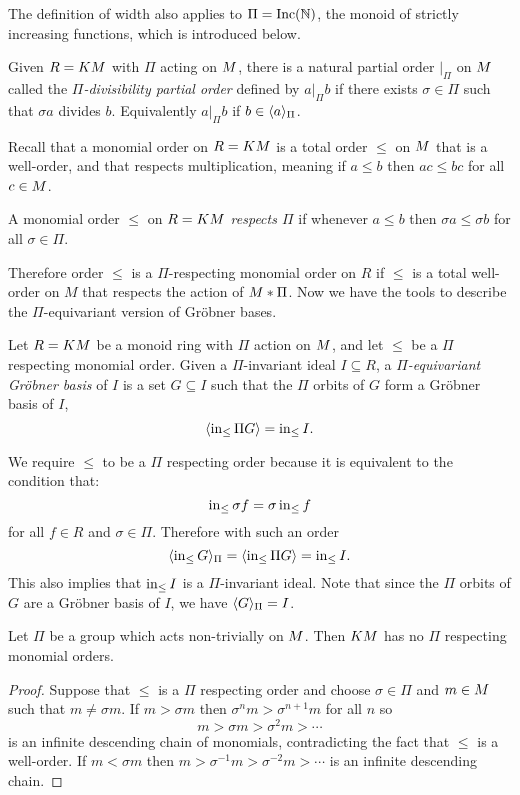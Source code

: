 The definition of width also applies to $\Pi = \operatorname{Inc}(\mathbb N)$, the monoid of strictly increasing functions, which is introduced below.
 
\begin{definition}
 Given $R = KM$ with $\Pi$ acting on $M$, there is a natural partial order $|_\Pi$ on $M$ called the {\em $\Pi$-divisibility partial order} defined by $a |_\Pi b$ if there exists $\sigma \in \Pi$ such that $\sigma a$ divides $b$.  Equivalently $a |_\Pi b$ if $b \in \langle a \rangle_\Pi$.
\end{definition}

Recall that a monomial order on $R = KM$ is a total order $\leq$ on $M$ that is a well-order, and that respects multiplication, meaning if $a \leq b$ then $ac \leq bc$ for all $c \in M$.

\begin{definition}
 A monomial order $\leq$ on $R = KM$ {\em respects $\Pi$} if whenever $a \leq b$ then $\sigma a \leq \sigma b$ for all $\sigma \in \Pi$.
\end{definition}

Therefore order $\leq$ is a $\Pi$-respecting monomial order on $R$ if $\leq$ is a total well-order on $M$ that respects the action of $M*\Pi$.
Now we have the tools to describe the $\Pi$-equivariant version of Gr\"obner bases.
\begin{definition}
 Let $R = KM$ be a monoid ring with $\Pi$ action on $M$, and let $\leq$ be a $\Pi$ respecting monomial order.  Given a $\Pi$-invariant ideal $I \subseteq R$, a {\em $\Pi$-equivariant Gr\"obner basis} of $I$ is a set $G \subseteq I$ such that the $\Pi$ orbits of $G$ form a Gr\"obner basis of $I$,
 \[ \langle \operatorname{in}_{\leq} \Pi G \rangle = \operatorname{in}_{\leq} I. \]
\end{definition}
We require $\leq$ to be a $\Pi$ respecting order because it is equivalent to the condition that:
\[ \operatorname{in}_{\leq} \sigma f = \sigma \operatorname{in}_{\leq} f \]
for all $f \in R$ and $\sigma \in \Pi$.  Therefore with such an order
 \[ \langle \operatorname{in}_{\leq} G \rangle_{\Pi} = \langle \operatorname{in}_{\leq} \Pi G \rangle = \operatorname{in}_{\leq} I. \]
This also implies that $\operatorname{in}_{\leq} I$ is a $\Pi$-invariant ideal.  Note that since the $\Pi$ orbits of $G$ are a Gr\"obner basis of $I$, we have $\langle G \rangle_\Pi = I$.


\begin{proposition}\label{prop:nogroup}
 Let $\Pi$ be a group which acts non-trivially on $M$.  Then $KM$ has no $\Pi$ respecting monomial orders.
\end{proposition}
\begin{proof}
 Suppose that $\leq$ is a $\Pi$ respecting order and choose $\sigma \in \Pi$ and $m \in M$ such that $m \neq \sigma m$.  If $m > \sigma m$ then $\sigma^n m > \sigma^{n+1} m$ for all $n$ so
  \[ m > \sigma m > \sigma^2 m > \cdots \]
 is an infinite descending chain of monomials, contradicting the fact that $\leq$ is a well-order.  If $m < \sigma m$ then $m > \sigma^{-1} m > \sigma^{-2} m > \cdots$ is an infinite descending chain.
\end{proof}

